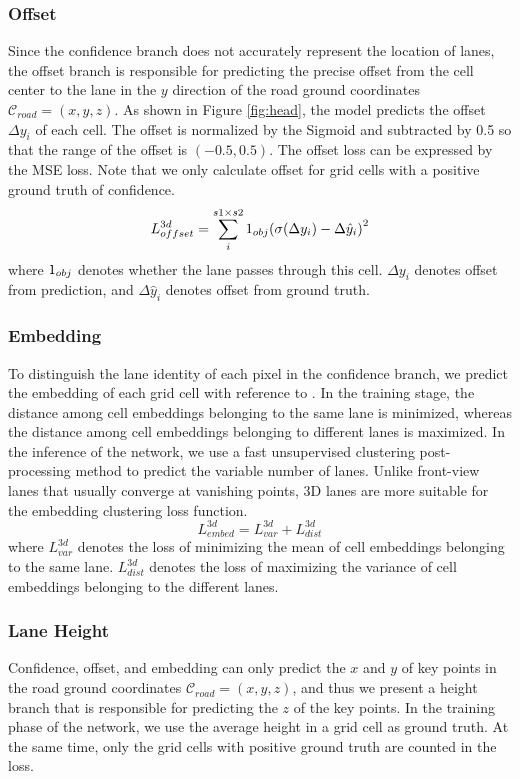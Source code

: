\documentclass[10pt,twocolumn,letterpaper]{article}
\begin{document}
\subsubsection{Offset}
Since the confidence branch does not accurately represent the location of lanes, the offset branch is responsible for predicting the precise offset from the cell center to the lane in the $y$ direction of the road ground coordinates $\mathcal{C}_{road}=\left(x,y,z\right)$. As shown in Figure \ref{fig:head}, the model predicts the offset $\Delta {y_i}$ of each cell. The offset is normalized by the Sigmoid and subtracted by 0.5 so that the range of the offset is $(-0.5, 0.5)$. The offset loss can be expressed by the MSE loss. Note that we only calculate offset for grid cells with a positive ground truth of confidence.
\begin{equation}
L_{offset}^{3d} = \sum\limits_i^{s1 \times s2} {{{\rm{1}}_{obj}}{{(\sigma (\Delta {y_i}) - \Delta {{\hat y}_i})}^2}}
\end{equation}
where ${{\rm{1}}_{obj}}$ denotes whether the lane passes through this cell. $\Delta {y_i}$ denotes offset from prediction, and $\Delta {{\hat y}_i}$ denotes offset from ground truth.

\subsubsection{Embedding}
To distinguish the lane identity of each pixel in the confidence branch, we predict the embedding of each grid cell with reference to \cite{de2017semantic, neven2018towards}. In the training stage, the distance among cell embeddings belonging to the same lane is minimized, whereas the distance among cell embeddings belonging to different lanes is maximized. In the inference of the network, we use a fast unsupervised clustering post-processing method to predict the variable number of lanes. Unlike front-view lanes that usually converge at vanishing points, 3D lanes are more suitable for the embedding clustering loss function.
\begin{equation}
L_{embed}^{3d} = L_{var}^{3d} + L_{dist}^{3d}
\end{equation}
where $L_{var}^{3d}$ denotes the loss of minimizing the mean of cell embeddings belonging to the same lane. $L_{dist}^{3d}$ denotes the loss of maximizing the variance of cell embeddings belonging to the different lanes.
\subsubsection{Lane Height}
Confidence, offset, and embedding can only predict the $x$ and $y$ of key points in the road ground coordinates $\mathcal{C}_{road}=\left(x,y,z\right)$, and thus we present a height branch that is responsible for predicting the $z$ of the key points. In the training phase of the network, we use the average height in a grid cell as ground truth. At the same time, only the grid cells with positive ground truth are counted in the loss.
\end{document}
